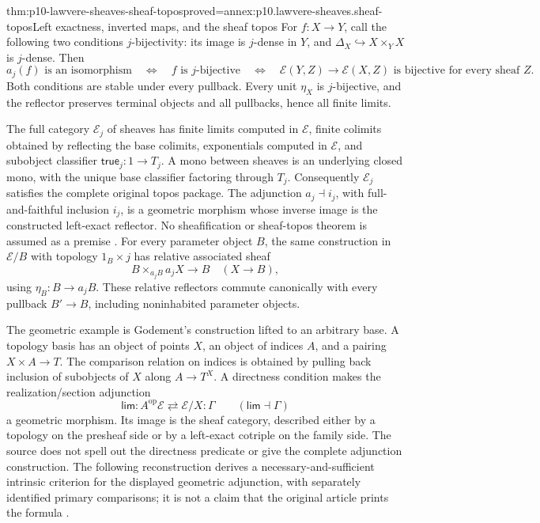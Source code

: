 \begin{hbtheorem}{thm:p10-lawvere-sheaves-sheaf-topos}{proved=annex:p10.lawvere-sheaves.sheaf-topos}{Left exactness, inverted maps, and the sheaf topos}
For \(f:X\to Y\), call the following two conditions
\(j\)-bijectivity: its image is \(j\)-dense in \(Y\),
and \(\Delta_X\hookrightarrow X\times_YX\) is
\(j\)-dense.  Then
\[
 a_j(f)\text{ is an isomorphism}
 \quad\Longleftrightarrow\quad f\text{ is }j\text{-bijective}
 \quad\Longleftrightarrow\quad
 \mathcal E(Y,Z)\to\mathcal E(X,Z)\text{ is bijective
 for every sheaf }Z.
\]
Both conditions are stable under every pullback.  Every unit
\(\eta_X\) is \(j\)-bijective, and the reflector preserves
terminal objects and all pullbacks, hence all finite limits.

The full category \(\mathcal E_j\) of sheaves has finite
limits computed in \(\mathcal E\), finite colimits obtained
by reflecting the base colimits, exponentials computed in
\(\mathcal E\), and subobject classifier
\(\mathsf{true}_j:1\to T_j\).  A mono between sheaves
is an underlying closed mono, with the unique base classifier
factoring through \(T_j\).  Consequently \(\mathcal E_j\)
satisfies the complete original topos package.  The adjunction
\(a_j\dashv i_j\), with full-and-faithful inclusion \(i_j\),
is a geometric morphism whose inverse image is the constructed
left-exact reflector.  No sheafification or sheaf-topos theorem
is assumed as a premise \cite[p.~331]{Lawvere1970}.
For every parameter object \(B\), the same construction in
\(\mathcal E/B\) with topology \(1_B\times j\) has
relative associated sheaf
\[
                    B\times_{a_jB}a_jX\longrightarrow B
                         \quad(X\to B),
\]
using \(\eta_B:B\to a_jB\).  These relative reflectors
commute canonically with every pullback \(B'\to B\),
including noninhabited parameter objects.
\end{hbtheorem}

The geometric example is Godement's construction lifted to an arbitrary
base.  A topology basis has an object of points \(X\), an object of
indices \(A\), and a pairing \(X\times A\to T\).  The
comparison relation on indices is obtained by pulling back inclusion
of subobjects of \(X\) along \(A\to T^X\).  A directness
condition makes the realization/section adjunction
\[
 \mathsf{lim}:A^{\mathrm{op}}\mathcal E
       \rightleftarrows\mathcal E/X:\Gamma
 \qquad (\mathsf{lim}\dashv\Gamma)
\]
a geometric morphism.  Its image is the sheaf category, described
either by a topology on the presheaf side or by a left-exact
cotriple on the family side.  The source does not spell out the
directness predicate or give the complete adjunction construction.
The following reconstruction derives a necessary-and-sufficient
intrinsic criterion for the displayed geometric adjunction, with
separately identified primary comparisons; it is not a claim that
the original article prints the formula
\cite[pp.~331--332]{Lawvere1970}.

